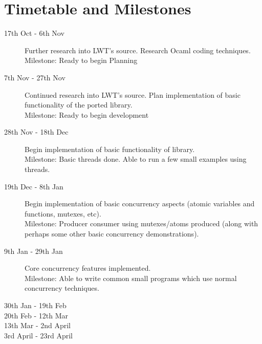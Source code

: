 \documentclass[a4paper]{article}
\begin{document}
\section{Timetable and Milestones}
\label{sec:timetable}

\begin{description}
\item[17th Oct - 6th Nov] Further research into LWT's source. Research Ocaml coding techniques.\\
Milestone: Ready to begin Planning

\item[7th Nov - 27th Nov]
Continued research into LWT's source. Plan implementation of basic functionality of the ported library.\\
Milestone: Ready to begin development

\item[28th Nov - 18th Dec] Begin implementation of basic functionality of library.\\
Milestone: Basic threads done. Able to run a few small examples using threads.

\item[19th Dec - 8th Jan] Begin implementation of basic concurrency aspects (atomic variables and functions, mutexes, etc).\\
Milestone: Producer consumer using mutexes/atoms produced (along with perhaps some other basic concurrency demonstrations).

\item[9th Jan - 29th Jan] Core concurrency features implemented.\\
Milestone: Able to write common small programs which use normal concurrency techniques.

\item[30th Jan - 19th Feb] 

\item[20th Feb - 12th Mar]

\item[13th Mar - 2nd April]

\item[3rd April - 23rd April]



\end{description}
\end{document}
